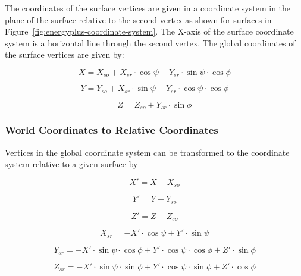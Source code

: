 The coordinates of the surface vertices are given in a coordinate system in the plane of the surface relative to the second vertex as shown for surfaces in Figure~\ref{fig:energyplus-coordinate-system}. The X-axis of the surface coordinate system is a horizontal line through the second vertex. The global coordinates of the surface vertices are given by:

\begin{equation}
X = {X_{so}} + {X_{sr}}\cdot \cos \psi  - {Y_{sr}}\cdot \sin \psi \cdot \cos \phi
\end{equation}

\begin{equation}
Y = {Y_{so}} + {X_{sr}}\cdot \sin \psi  - {Y_{sr}}\cdot \cos \psi \cdot \cos \phi
\end{equation}

\begin{equation}
Z = {Z_{so}} + {Y_{sr}}\cdot \sin \phi
\end{equation}

\subsubsection{World Coordinates to Relative Coordinates}\label{world-coordinates-to-relative-coordinates}

Vertices in the global coordinate system can be transformed to the coordinate system relative to a given surface by

\begin{equation}
{X'} = X - {X_{so}}
\end{equation}

\begin{equation}
{Y'} = Y - {Y_{so}}
\end{equation}

\begin{equation}
{Z'} = Z - {Z_{so}}
\end{equation}

\begin{equation}
{X_{sr}} =  - {X'}\cdot \cos \psi  + {Y'}\cdot \sin \psi
\end{equation}

\begin{equation}
{Y_{sr}} =  - {X'}\cdot \sin \psi \cdot \cos \phi  + {Y'}\cdot \cos \psi \cdot \cos \phi  + {Z'}\cdot \sin \phi
\end{equation}

\begin{equation}
{Z_{sr}} =  - {X'}\cdot \sin \psi \cdot \sin \phi  + {Y'}\cdot \cos \psi \cdot \sin \phi  + {Z'}\cdot \cos \phi
\label{eq:ZsrEquation}
\end{equation}

